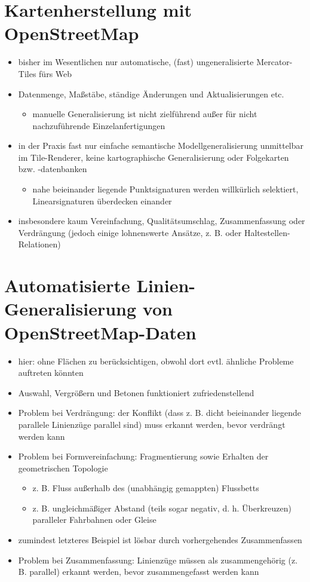 \documentclass{../thesis}
\begin{document}
\section{Kartenherstellung mit OpenStreetMap}

\begin{itemize}
	\item bisher im Wesentlichen nur automatische, (fast) ungeneralisierte Mercator-Tiles fürs Web
	\item Datenmenge, Maßstäbe, ständige Änderungen und Aktualisierungen etc.
	\begin{itemize}
		\item manuelle Generalisierung ist nicht zielführend außer für nicht nachzuführende Einzelanfertigungen
	\end{itemize}
	\item in der Praxis fast nur einfache semantische Modellgeneralisierung unmittelbar im Tile-Renderer, keine kartographische Generalisierung oder Folgekarten bzw. -datenbanken
	\begin{itemize}
		\item nahe beieinander liegende Punktsignaturen werden willkürlich selektiert, Linearsignaturen überdecken einander
	\end{itemize}
	\item insbesondere kaum Vereinfachung, Qualitätsumschlag, Zusammenfassung oder Verdrängung (jedoch einige lohnenswerte Ansätze, z. B. \cite{MWG12} oder Haltestellen-Relationen)
\end{itemize}

\section{Automatisierte Linien-Generalisierung von OpenStreetMap-Daten}

\begin{itemize}
	\item hier: ohne Flächen zu berücksichtigen, obwohl dort evtl. ähnliche Probleme auftreten könnten
	\item Auswahl, Vergrößern und Betonen funktioniert zufriedenstellend
	\item Problem bei Verdrängung: der Konflikt (dass z. B. dicht beieinander liegende parallele Linienzüge parallel sind) muss erkannt werden, bevor verdrängt werden kann
	\item Problem bei Formvereinfachung: Fragmentierung sowie Erhalten der geometrischen Topologie
	\begin{itemize}
		\item z. B. Fluss außerhalb des (unabhängig gemappten) Flussbetts \cite{Kla11}
		\item z. B. ungleichmäßiger Abstand (teils sogar negativ, d. h. Überkreuzen) paralleler Fahrbahnen oder Gleise
	\end{itemize}
	\item zumindest letzteres Beispiel ist lösbar durch vorhergehendes Zusammenfassen
	\item Problem bei Zusammenfassung: Linienzüge müssen als zusammengehörig (z. B. parallel) erkannt werden, bevor zusammengefasst werden kann
\end{itemize}
\end{document}
